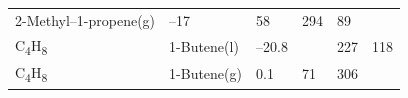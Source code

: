 \documentclass[
  9pt,
]{extbook}
\theoremstyle{definition}
\theoremstyle{definition}
\theoremstyle{definition}
\theoremstyle{remark}
\begin{document}
\begin{longtable}[]{@{}llllll@{}}
\begin{minipage}[t]{0.17\columnwidth}
2-Methyl--1-propene(g)\strut
\end{minipage} & \begin{minipage}[t]{0.15\columnwidth}\raggedright
--17\strut
\end{minipage} & \begin{minipage}[t]{0.15\columnwidth}\raggedright
58\strut
\end{minipage} & \begin{minipage}[t]{0.14\columnwidth}\raggedright
294\strut
\end{minipage} & \begin{minipage}[t]{0.14\columnwidth}\raggedright
89\strut
\end{minipage}\tabularnewline
\begin{minipage}[t]{0.07\columnwidth}\raggedright
C\textsubscript{4}H\textsubscript{8}\strut
\end{minipage} & \begin{minipage}[t]{0.17\columnwidth}\raggedright
1-Butene(l)\strut
\end{minipage} & \begin{minipage}[t]{0.15\columnwidth}\raggedright
--20.8\strut
\end{minipage} & \begin{minipage}[t]{0.15\columnwidth}\raggedright
\strut
\end{minipage} & \begin{minipage}[t]{0.14\columnwidth}\raggedright
227\strut
\end{minipage} & \begin{minipage}[t]{0.14\columnwidth}\raggedright
118\strut
\end{minipage}\tabularnewline
\begin{minipage}[t]{0.07\columnwidth}\raggedright
C\textsubscript{4}H\textsubscript{8}\strut
\end{minipage} & \begin{minipage}[t]{0.17\columnwidth}\raggedright
1-Butene(g)\strut
\end{minipage} & \begin{minipage}[t]{0.15\columnwidth}\raggedright
0.1\strut
\end{minipage} & \begin{minipage}[t]{0.15\columnwidth}\raggedright
71\strut
\end{minipage} & \begin{minipage}[t]{0.14\columnwidth}\raggedright
306\strut
\end{minipage} & \begin{minipage}[t]{0.14\columnwidth}\raggedright

\end{minipage}
\end{longtable}
\end{document}
